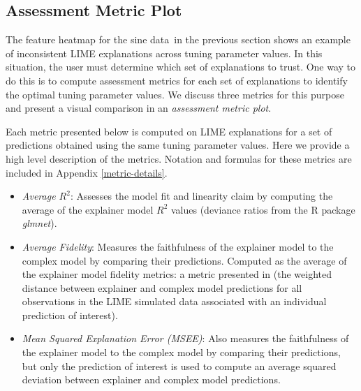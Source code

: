 \documentclass[AMS,STIX2COL]{WileyNJD-v2}\usepackage[]{graphicx}\usepackage[]{color}
\newcommand{\data}{sine data}
\begin{document}
\subsection{Assessment Metric Plot} \label{assess-metric}

The feature heatmap for the \data \ in the previous section shows an example of inconsistent LIME explanations across tuning parameter values. In this situation, the user must determine which set of explanations to trust. One way to do this is to compute assessment metrics for each set of explanations to identify the optimal tuning parameter values. We discuss three metrics for this purpose and present a visual comparison in an \emph{assessment metric plot}.

Each metric presented below is computed on LIME explanations for a set of predictions obtained using the same tuning parameter values. Here we provide a high level description of the metrics. Notation and formulas for these metrics are included in Appendix \ref{metric-details}.

\begin{itemize}
\item \emph{Average $R^2$}: Assesses the model fit and linearity claim by computing the average of the explainer model $R^2$ values (deviance ratios from the R package \emph{glmnet}).

\item \emph{Average Fidelity}: Measures the faithfulness of the explainer model to the complex model by comparing their predictions. Computed as the average of the explainer model fidelity metrics: a metric presented in \citet{ribeiro:2016} (the weighted distance between explainer and complex model predictions for all observations in the LIME simulated data associated with an individual prediction of interest). 

\item \emph{Mean Squared Explanation Error (MSEE)}: Also measures the faithfulness of the explainer model to the complex model by comparing their predictions, but only the prediction of interest is used to compute an average squared deviation between explainer and complex model predictions.
\end{itemize}
\end{document}
